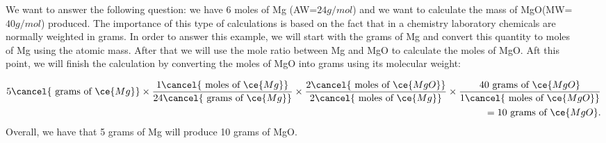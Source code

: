 \documentclass[main.tex]{subfiles}
\begin{document}
\begin{description}
\item[] 
We want to answer the following question: we have 6 moles of Mg (AW=$24g/mol$) and we want to calculate the mass of MgO(MW=$40g/mol$) produced. The importance of this type of calculations is based on the fact that in a chemistry laboratory chemicals are normally weighted in grams. In order to answer this example, we will start with the grams of Mg and convert this quantity to moles of Mg using the atomic mass. After that we will use the mole ratio between Mg and MgO to calculate the moles of MgO. Aft this point, we will finish the calculation by converting the moles of MgO into grams using its molecular weight:

\begin{equation*}\begin{split}
5\cancel{\text{ grams of }\ce{Mg}}   \times  \dfrac{1 \cancel{\text{ moles of }\ce{Mg}}}{24\cancel{\text{ grams of }\ce{Mg}}}
 \times \dfrac{2\cancel{\text{ moles of }\ce{MgO}}}{2\cancel{\text{ moles of }\ce{Mg}}}
  \times  \dfrac{40\text{ grams of }\ce{MgO}}{1\cancel{\text{ moles of }\ce{MgO}}}\\
 =10\text{ grams of }\ce{MgO}.
\end{split}\end{equation*}
Overall, we have that 5 grams of Mg will produce 10 grams of MgO.


\end{description}
\end{document}
